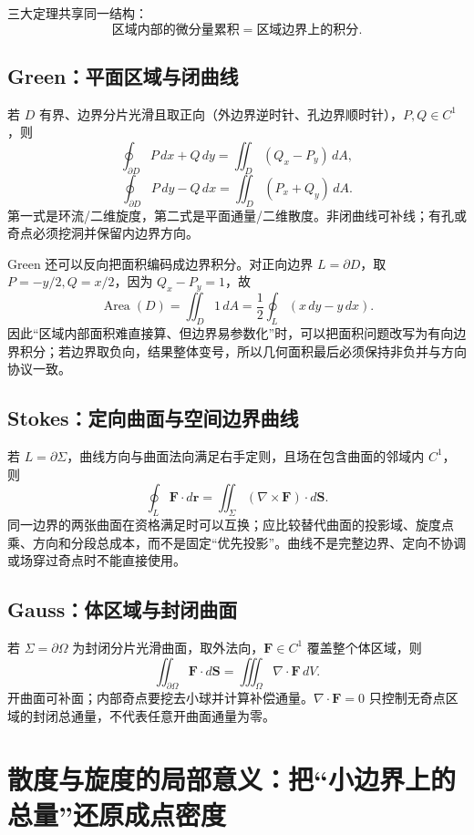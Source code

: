 \documentclass[11pt,a4paper,fontset=fandol]{ctexart}
\begin{document}
三大定理共享同一结构：
\[
\boxed{\text{区域内部的微分量累积}=\text{区域边界上的积分}.}
\]

\subsection{Green：平面区域与闭曲线}

若 $D$ 有界、边界分片光滑且取正向（外边界逆时针、孔边界顺时针），$P,Q\in C^1$，则
\[
\boxed{\oint_{\partial D}P\,dx+Q\,dy
=\iint_D(Q_x-P_y)\,dA,}
\]
\[
\boxed{\oint_{\partial D}P\,dy-Q\,dx
=\iint_D(P_x+Q_y)\,dA.}
\]
第一式是环流/二维旋度，第二式是平面通量/二维散度。非闭曲线可补线；有孔或奇点必须挖洞并保留内边界方向。

Green 还可以反向把面积编码成边界积分。对正向边界 $L=\partial D$，取 $P=-y/2,Q=x/2$，因为 $Q_x-P_y=1$，故
\[
\boxed{
\operatorname{Area}(D)
=\iint_D1\,dA
=\frac12\oint_L(x\,dy-y\,dx).}
\]
因此“区域内部面积难直接算、但边界易参数化”时，可以把面积问题改写为有向边界积分；若边界取负向，结果整体变号，所以几何面积最后必须保持非负并与方向协议一致。

\subsection{Stokes：定向曲面与空间边界曲线}

若 $L=\partial\Sigma$，曲线方向与曲面法向满足右手定则，且场在包含曲面的邻域内 $C^1$，则
\[
\boxed{\oint_L\mathbf F\cdot d\mathbf r
=\iint_\Sigma(\nabla\times\mathbf F)\cdot d\mathbf S.}
\]
同一边界的两张曲面在资格满足时可以互换；应比较替代曲面的投影域、旋度点乘、方向和分段总成本，而不是固定“优先投影”。曲线不是完整边界、定向不协调或场穿过奇点时不能直接使用。

\subsection{Gauss：体区域与封闭曲面}

若 $\Sigma=\partial\Omega$ 为封闭分片光滑曲面，取外法向，$\mathbf F\in C^1$ 覆盖整个体区域，则
\[
\boxed{\iint_{\partial\Omega}\mathbf F\cdot d\mathbf S
=\iiint_\Omega\nabla\cdot\mathbf F\,dV.}
\]
开曲面可补面；内部奇点要挖去小球并计算补偿通量。$\nabla\cdot\mathbf F=0$ 只控制无奇点区域的封闭总通量，不代表任意开曲面通量为零。

\section{散度与旋度的局部意义：把“小边界上的总量”还原成点密度}
\end{document}
